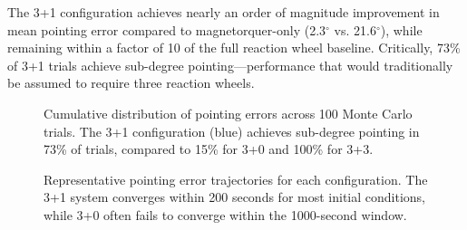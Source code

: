 \documentclass[9pt]{extarticle}
\begin{document}
The 3+1 configuration achieves nearly an order of magnitude improvement in mean pointing error compared to magnetorquer-only (2.3$^\circ$ vs. 21.6$^\circ$), while remaining within a factor of 10 of the full reaction wheel baseline. Critically, 73\% of 3+1 trials achieve sub-degree pointing---performance that would traditionally be assumed to require three reaction wheels.

\begin{figure}[h]
    \centering
    \caption{Cumulative distribution of pointing errors across 100 Monte Carlo trials. The 3+1 configuration (blue) achieves sub-degree pointing in 73\% of trials, compared to 15\% for 3+0 and 100\% for 3+3.}
    \label{fig:pd_cdf}
\end{figure}

\begin{figure}[h]
    \centering
    \caption{Representative pointing error trajectories for each configuration. The 3+1 system converges within 200 seconds for most initial conditions, while 3+0 often fails to converge within the 1000-second window.}
    \label{fig:error_trajectories}
\end{figure}
\end{document}
